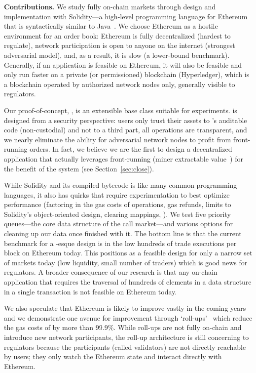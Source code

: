 \textbf{Contributions.} We study fully on-chain markets through design and implementation with Solidity---a high-level programming language for Ethereum that is syntactically similar to Java~\cite{Ethereum41:online}. We choose Ethereum as a hostile environment for an order book: Ethereum is fully decentralized (hardest to regulate), network participation is open to anyone on the internet (strongest adversarial model), and, as a result, it is slow (a lower-bound benchmark). Generally, if an application is feasible on Ethereum, it will also be feasible and only run faster on a private (or permissioned) blockchain (\eg Hyperledger), which is a blockchain operated by authorized network nodes only, generally visible to regulators. 

Our proof-of-concept, \cm, is an extensible base class suitable for experiments. \cm is designed from a security perspective: users only trust their assets to \cm's auditable code (non-custodial) and not to a third part, all operations are transparent, and we nearly eliminate the ability for adversarial network nodes to profit from front-running orders. In fact, we believe we are the first to design a decentralized application that actually leverages front-running (\ie miner extractable value~\cite{daian2019flash}) for the benefit of the system (see Section~\ref{sec:close}).  

While Solidity and its compiled bytecode is like many common programming languages, it also has quirks that require experimentation to best optimize performance (\eg factoring in the gas costs of operations, gas refunds, limits to Solidity's object-oriented design, clearing mappings, \etc). We test five priority queues---the core data structure of the call market---and various options for cleaning up our data once finished with it. The bottom line is that the current benchmark for a \cm-esque design is in the low hundreds of trade executions per block on Ethereum today. This positions \cm as a feasible design for only a narrow set of markets today (low liquidity, small number of traders) which is good news for regulators. A broader consequence of our research is that any on-chain application that requires the traversal of hundreds of elements in a data structure in a single transaction is not feasible on Ethereum today. 

We also speculate that Ethereum is likely to improve vastly in the coming years and we demonstrate one avenue for improvement through `roll-ups'~\cite{kalodner2018arbitrum} which reduce the gas costs of \cm by more than 99.9\%. While roll-ups are not fully on-chain and introduce new network participants, the roll-up architecture is still concerning to regulators because the participants (called validators) are not directly reachable by users; they only watch the Ethereum state and interact directly with Ethereum.  

